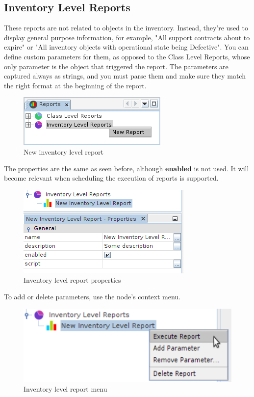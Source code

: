 \documentclass[a4paper]{article}
\begin{document}
		\subsection{Inventory Level Reports}
			These reports are not related to objects in the inventory. Instead, they're used to display general purpose information, for example, "All support contracts about to expire" or "All inventory objects with operational state being Defective". You can define custom parameters for them, as opposed to the Class Level Reports, whose only parameter is the object that triggered the report. The parameters are captured always as strings, and you must parse them and make sure they match the right format at the beginning of the report.
			\begin{figure}[h!]
				\centering
				\includegraphics[scale=0.8]{img/reports_new_inventory_report.png}
				\caption{New inventory level report}
				\label{fig:reports_new_inventory_report}
			\end{figure} \newline
			The properties are the same as seen before, although \textbf{enabled} is not used. It will become relevant when scheduling the execution of reports is supported.
			\begin{figure}[h!]
				\centering
				\includegraphics[scale=0.8]{img/reports_inventory_report_properties.png}
				\caption{Inventory level report properties}
				\label{fig:reports_inventory_report_properties}
			\end{figure} \newline
			To add or delete parameters, use the node's context menu.
			\begin{figure}[h!]
				\centering
				\includegraphics[scale=0.8]{img/reports_context_menu.png}
				\caption{Inventory level report menu}
				\label{fig:reports_context_menu}
			\end{figure} \newline
\end{document}
